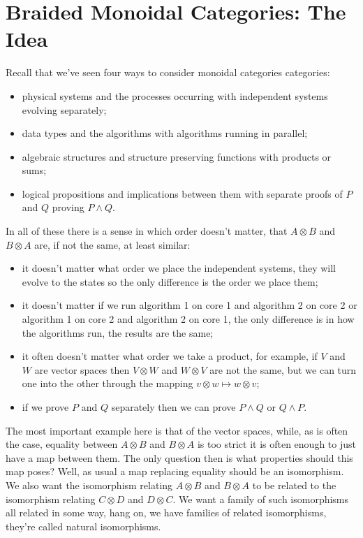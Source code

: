 \documentclass[fleqn]{NotesClass}
\begin{document}
    \section{Braided Monoidal Categories: The Idea}
    Recall that we've seen four ways to consider monoidal categories categories:
    \begin{itemize}
        \item physical systems and the processes occurring with independent systems evolving separately;
        \item data types and the algorithms with algorithms running in parallel;
        \item algebraic structures and structure preserving functions with products or sums;
        \item logical propositions and implications between them with separate proofs of \(P\) and \(Q\) proving \(P \land Q\).
    \end{itemize}
    In all of these there is a sense in which order doesn't matter, that \(A \otimes B\) and \(B \otimes A\) are, if not the same, at least similar:
    \begin{itemize}
        \item it doesn't matter what order we place the independent systems, they will evolve to the states so the only difference is the order we place them;
        \item it doesn't matter if we run algorithm 1 on core 1 and algorithm 2 on core 2 or algorithm 1 on core 2 and algorithm 2 on core 1, the only difference is in how the algorithms run, the results are the same;
        \item it often doesn't matter what order we take a product, for example, if \(V\) and \(W\) are vector spaces then \(V \otimes W\) and \(W \otimes V\) are not the same, but we can turn one into the other through the mapping \(v \otimes w \mapsto w \otimes v\);
        \item if we prove \(P\) and \(Q\) separately then we can prove \(P \land Q\) or \(Q \land P\).
    \end{itemize}
    
    The most important example here is that of the vector spaces, while, as is often the case, equality between \(A \otimes B\) and \(B \otimes A\) is too strict it is often enough to just have a map between them.
    The only question then is what properties should this map poses?
    Well, as usual a map replacing equality should be an isomorphism.
    We also want the isomorphism relating \(A \otimes B\) and \(B \otimes A\) to be related to the isomorphism relating \(C \otimes D\) and \(D \otimes C\).
    We want a family of such isomorphisms all related in some way, hang on, we have families of related isomorphisms, they're called natural isomorphisms.
    
\end{document}
